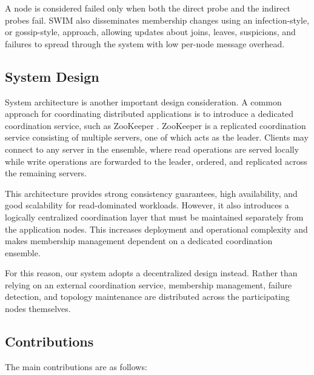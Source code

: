 A node is considered failed only when both the direct probe and the indirect probes fail. SWIM also disseminates
membership changes using an infection-style, or gossip-style, approach, allowing updates about joins, leaves,
suspicions, and failures to spread through the system with low per-node message overhead.

\subsection{System Design}
System architecture is another important design consideration. A common approach for coordinating distributed
applications is to introduce a dedicated coordination service, such as ZooKeeper
\cite{huntZooKeeperWaitfreeCoordination}. ZooKeeper is a replicated coordination service consisting of multiple
servers, one of which acts as the leader. Clients may connect to any server in the ensemble, where read operations are
served locally while write operations are forwarded to the leader, ordered, and replicated across the remaining
servers.

This architecture provides strong consistency guarantees, high availability, and good scalability for read-dominated
workloads. However, it also introduces a logically centralized coordination layer that must be maintained separately
from the application nodes. This increases deployment and operational complexity and makes membership management
dependent on a dedicated coordination ensemble.

For this reason, our system adopts a decentralized design instead. Rather than relying on an external coordination
service, membership management, failure detection, and topology maintenance are distributed across the participating
nodes themselves.

\subsection{Contributions}
\label{subsec:contribution}

The main contributions are as follows:

